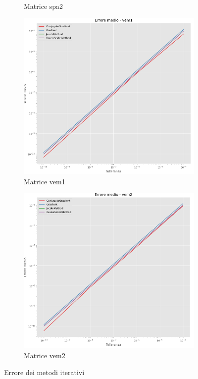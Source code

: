\begin{figure}[!ht]
\begin{subfigure}{0.45\textwidth}
        \caption{Matrice spa2}
        \label{fig:error_spa2}
    \end{subfigure}
    \begin{subfigure}{0.45\textwidth}
        \centering
        \includegraphics[width=\textwidth]{./img/error_vem1.png}
        \caption{Matrice vem1}
        \label{fig:error_vem1}
    \end{subfigure}
    \begin{subfigure}{0.45\textwidth}
        \centering
        \includegraphics[width=\textwidth]{./img/error_vem2.png}
        \caption{Matrice vem2}
        \label{fig:error_vem2}
    \end{subfigure}
    \caption{Errore dei metodi iterativi}
    \label{fig:error}
\end{figure}


